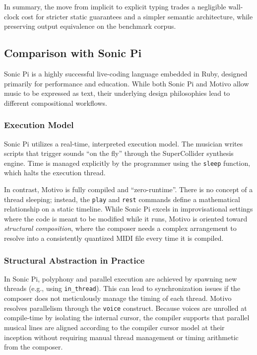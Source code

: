 In summary, the move from implicit to explicit typing trades a negligible wall-clock cost for stricter static guarantees
and a simpler semantic architecture, while preserving output equivalence on the benchmark corpus.

\subsection{Comparison with Sonic Pi}\label{detail-subsec:comparison-with-sonic-pi}

Sonic Pi is a highly successful live-coding language embedded in Ruby, designed primarily for performance and education.
While both Sonic Pi and Motivo allow music to be expressed as text, their underlying design philosophies lead
to different
compositional workflows.

\subsubsection{Execution Model}
Sonic Pi utilizes a real-time, interpreted execution model.
The musician writes scripts that trigger sounds ``on the fly'' through the SuperCollider synthesis engine.
Time is managed explicitly by the programmer using the \texttt{sleep} function, which halts the execution thread.

In contrast, Motivo is fully compiled and ``zero-runtime''.
There is no concept of a thread sleeping; instead, the \texttt{play} and \texttt{rest} commands define a mathematical
relationship on a static timeline.
While Sonic Pi excels in improvisational settings where the code is meant to be modified while it runs, Motivo is
oriented toward \textit{structural composition}, where the composer needs a complex arrangement to resolve into a
consistently quantized MIDI file every time it is compiled.

\subsubsection{Structural Abstraction in Practice}
In Sonic Pi, polyphony and parallel execution are achieved by spawning new threads (e.g., using \texttt{in\_thread}).
This can lead to synchronization issues if the composer does not meticulously manage the timing of each thread.
Motivo resolves parallelism through the \texttt{voice} construct.
Because voices are unrolled at compile-time by isolating the internal cursor, the compiler supports that
parallel musical
lines are aligned according to the compiler cursor model at their inception without requiring manual thread
management or
timing arithmetic from the composer.

